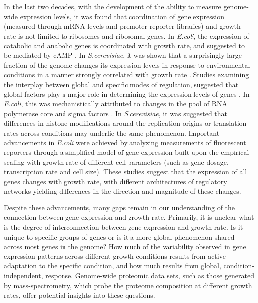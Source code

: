 \documentclass[notitlepage]{article}
\begin{document}
In the last two decades, with the development of the ability to measure genome-wide expression levels, it was found that coordination of gene expression (measured through mRNA levels and promoter-reporter libraries) and growth rate is not limited to ribosomes and ribosomal genes.
In \emph{E.coli}, the expression of catabolic and anabolic genes is coordinated with growth rate, and suggested to be mediated by cAMP \cite{Saldanha2004}.
In \emph{S.cerevisiae}, it was shown that a surprisingly large fraction of the genome changes its expression levels in response to environmental conditions in a manner strongly correlated with growth rate \cite{Keren2013a,Gasch2000,Castrillo2007, Gerosa2013}.
Studies examining the interplay between global and specific modes of regulation, suggested that global factors play a major role in determining the expression levels of genes \cite{Gasch2000, Klumpp2009a,Scott2010, Berthoumieux2013}.
In \emph{E.coli}, this was mechanistically attributed to changes in the pool of RNA polymerase core and sigma factors \cite{Klumpp2008}.
In \emph{S.cerevisiae}, it was suggested that differences in histone modifications around the replication origins \cite{regenberg2006} or translation rates \cite{Gasch2000} across conditions may underlie the same phenomenon.
Important advancements in \emph{E.coli} were achieved by analyzing measurements of fluorescent reporters through a simplified model of gene expression built upon the empirical scaling with growth rate of different cell parameters (such as gene dosage, transcription rate and cell size)\cite{Klumpp2009a}.
These studies suggest that the expression of all genes changes with growth rate, with different architectures of regulatory networks yielding differences in the direction and magnitude of these changes. 

Despite these advancements, many gaps remain in our understanding of the connection between gene expression and growth rate.
Primarily, it is unclear what is the degree of interconnection between gene expression and growth rate.
Is it unique to specific groups of genes or is it a more global phenomenon shared across most genes in the genome?
How much of the variability observed in gene expression patterns across different growth conditions results from active adaptation to the specific condition, and how much results from global, condition-independent, response.
Genome-wide proteomic data sets, such as those generated by mass-spectrometry, which probe the proteome composition at different growth rates, offer potential insights into these questions.
\end{document}
